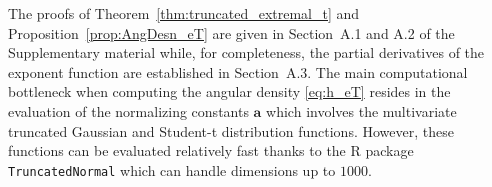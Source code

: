 \documentclass[12pt]{article}
\begin{document}

The proofs of Theorem~\ref{thm:truncated_extremal_t}  and Proposition~\ref{prop:AngDesn_eT} are given in Section~A.1 and A.2 of the Supplementary material while, for completeness, the partial derivatives of the exponent function are established in Section~A.3.
The main computational bottleneck when computing the angular density \eqref{eq:h_eT} resides in the evaluation of the normalizing constants $\bm a$ which involves the multivariate truncated Gaussian and Student-t distribution functions. However, these functions can be evaluated relatively fast thanks to the R package \texttt{TruncatedNormal} \citep{Botev.Belzile:2021} which can handle dimensions up to $1000$.   
\end{document}
